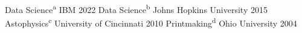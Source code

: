 \begin{cvdegrees}
  \cvdegree
    {\ibmDsHonor} %
    {Data Science\textsuperscript{a}}
    {IBM} %
    {2022} %
  \cvdegree
    {\jhuDsHonor} %
    {Data Science\textsuperscript{b}}
    {Johns Hopkins University} %
    {2015} %
  \cvdegree
    {\ucMsHonor} %
    {Astophysics\textsuperscript{c}}
    {University of Cincinnati} %
    {2010} %
\cvdegree
  {\ouBfaHonor} %
  {Printmaking\textsuperscript{d}}
  {Ohio University} %
  {2004} %
\end{cvdegrees}
